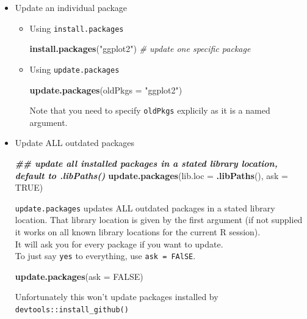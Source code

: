 \documentclass[
]{book}
\newenvironment{Shaded}{\begin{snugshade}}{\end{snugshade}}
\newcommand{\AttributeTok}[1]{\textcolor[rgb]{0.13,0.29,0.53}{#1}}
\newcommand{\CommentTok}[1]{\textcolor[rgb]{0.56,0.35,0.01}{\textit{#1}}}
\newcommand{\ConstantTok}[1]{\textcolor[rgb]{0.56,0.35,0.01}{#1}}
\newcommand{\DocumentationTok}[1]{\textcolor[rgb]{0.56,0.35,0.01}{\textbf{\textit{#1}}}}
\newcommand{\FunctionTok}[1]{\textcolor[rgb]{0.13,0.29,0.53}{\textbf{#1}}}
\newcommand{\NormalTok}[1]{#1}
\newcommand{\StringTok}[1]{\textcolor[rgb]{0.31,0.60,0.02}{#1}}
\begin{document}
\begin{itemize}
\item
  Update an individual package

  \begin{itemize}
  \item
    Using \texttt{install.packages}

\begin{Shaded}
\begin{Highlighting}[]
\FunctionTok{install.packages}\NormalTok{(}\StringTok{"ggplot2"}\NormalTok{) }\CommentTok{\# update one specific package}
\end{Highlighting}
\end{Shaded}
  \item
    Using \texttt{update.packages}

\begin{Shaded}
\begin{Highlighting}[]
\FunctionTok{update.packages}\NormalTok{(}\AttributeTok{oldPkgs =} \StringTok{"ggplot2"}\NormalTok{)}
\end{Highlighting}
\end{Shaded}

    Note that you need to {specify \texttt{oldPkgs} explicily} as it is a named argument.
  \end{itemize}
\item
  Update ALL outdated packages

\begin{Shaded}
\begin{Highlighting}[]
\DocumentationTok{\#\# update all installed packages in a stated library location, default to \textasciigrave{}.libPaths()\textasciigrave{}}
\FunctionTok{update.packages}\NormalTok{(}\AttributeTok{lib.loc =} \FunctionTok{.libPaths}\NormalTok{(), }\AttributeTok{ask =} \ConstantTok{TRUE}\NormalTok{) }
\end{Highlighting}
\end{Shaded}

  \texttt{update.packages} updates ALL outdated packages in a stated library location. That library location is given by the first argument (if not supplied it works on all known library locations for the current R session).\\
  It will ask you for every package if you want to update.\\
  To just say \texttt{yes} to everything, use \texttt{ask\ =\ FAlSE}.

\begin{Shaded}
\begin{Highlighting}[]
\FunctionTok{update.packages}\NormalTok{(}\AttributeTok{ask =} \ConstantTok{FALSE}\NormalTok{)}
\end{Highlighting}
\end{Shaded}

  Unfortunately this {won't} update packages installed by \texttt{devtools::install\_github()}
\end{itemize}
\end{document}

